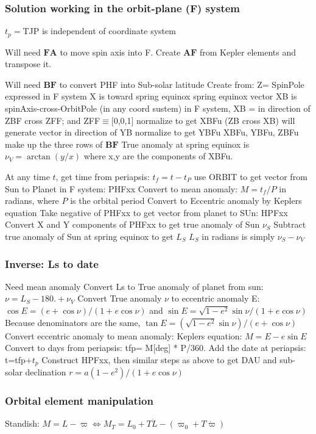 \documentclass[draft]{article}
\begin{document}
\subsubsection{Solution working in the orbit-plane (F) system}
 $t_p=$TJP is independent of coordinate system

Will need $\mathbf{FA}$ to move spin axis into F.
\qi Create $\mathbf{AF}$ from Kepler elements and transpose it.

Will need  $\mathbf{BF}$ to convert PHF into Sub-solar latitude
\qi Create from: Z= SpinPole expressed in F system
\qi  X is toward spring equinox
\qii spring equinox vector XB is spinAxis-cross-OrbitPole (in any coord sustem)
\qii in F system, XB = in direction of ZBF cross ZFF;  and  ZFF$\equiv$[0,0,1]
\qiii normalize to get XBFu
\qi (ZB cross XB) will generate vector in direction of YB
\qiii normalize to get YBFu
\qi XBFu, YBFu, ZBFu make up the three rows of  $\mathbf{BF}$ 
\qi True anomaly at spring equinox is $ \nu_V=\arctan(y/x)$ 
\qii  where x,y are the components of XBFu.

At any time $t$, get time from periapsis: $t_f=t-t_P$
\qi use ORBIT to get vector from Sun to Planet in F system: PHFxx
\qii Convert to mean anomaly: $M= t_f/P$ in radians, where $P$ is the orbital period
\qii Convert to Eccentric anomaly by Keplers equation
\qi Take negative of PHFxx to get vector from planet to SUn: HPFxx
\qi Convert X and Y components of PHFxx to get true anomaly of Sun $\nu_S$
\qi Subtract true anomaly of Sun at spring equinox to get $L_S$
\qii $L_S$ in radians is simply $\nu_S- \nu_V$

\subsubsection{ Inverse: Ls to date}
Need mean anomaly
\qi Convert Ls to True anomaly of planet from sun: $ \nu= L_S-180. + \nu_V  $
\qi Convert True anomaly $\nu$ to eccentric anomaly E:
\qii $\cos E =(e+ \cos \nu)/(1+ e\cos \nu) $ and $\sin E = \sqrt{1-e^2} \sin \nu /(1+ e\cos \nu)$
\qiii Because denominators are the same, $\tan E = (\sqrt{1-e^2} \sin \nu) /(e+ \cos \nu)$
\qi Convert eccentric anomaly to mean anomaly: Keplers equation: $M=E-e \sin E $
\qi Convert to days from periapsis: tfp= M[deg] * P/360.
\qi Add the date at periapsis: t=tfp$+t_p$
\qi Construct HPFxx, then similar steps as above to get DAU and sub-solar declination
\qiii $r=a(1-e^2)/(1+e \cos \nu)$


\subsubsection{Orbital element manipulation}
Standish: $M=L-\varpi  \Leftrightarrow M_T=L_0+T\dot{L}- \left( \varpi_0 +T\dot{\varpi} \right) $
\end{document}
